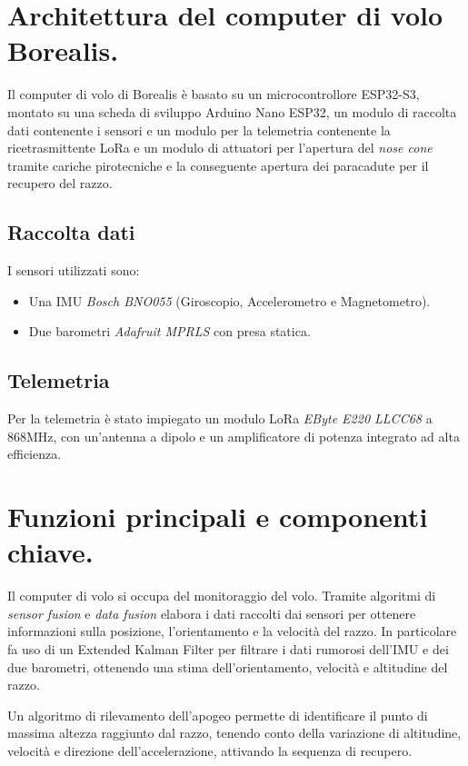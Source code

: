 \documentclass[12pt,a4paper,twoside]{book}
\begin{document}
\section{Architettura del computer di volo Borealis.}
Il computer di volo di Borealis è basato su un microcontrollore ESP32-S3, montato
su una scheda di sviluppo Arduino Nano ESP32, un modulo di raccolta dati contenente
i sensori e un modulo per la telemetria contenente la ricetrasmittente \ac{LoRa}
e un modulo di attuatori per l'apertura del \emph{nose cone} tramite cariche
pirotecniche e la conseguente apertura dei paracadute per il recupero del razzo.

\subsection{Raccolta dati}
I sensori utilizzati sono:
\begin{itemize}
    \item Una \ac{IMU} \emph{Bosch BNO055} (Giroscopio, Accelerometro e Magnetometro).
    \item Due barometri \emph{Adafruit MPRLS} con presa statica.
\end{itemize}

\subsection{Telemetria}
Per la telemetria è stato impiegato un modulo \ac{LoRa} \emph{EByte E220 LLCC68}
a 868MHz, con un'antenna a dipolo e un amplificatore di potenza integrato ad
alta efficienza. \\

\section{Funzioni principali e componenti chiave.}
Il computer di volo si occupa del monitoraggio del volo. Tramite algoritmi
di \emph{sensor fusion} e \emph{data fusion} elabora i dati raccolti dai sensori
per ottenere informazioni sulla posizione, l'orientamento e la velocità del razzo.
In particolare fa uso di un Extended Kalman Filter per filtrare i dati rumorosi
dell'\ac{IMU} e dei due barometri, ottenendo una stima dell'orientamento, velocità
e altitudine del razzo.

Un algoritmo di rilevamento dell'apogeo permette di identificare il punto di massima
altezza raggiunto dal razzo, tenendo conto della variazione di altitudine, velocità
e direzione dell'accelerazione, attivando la sequenza di recupero.
\end{document}
